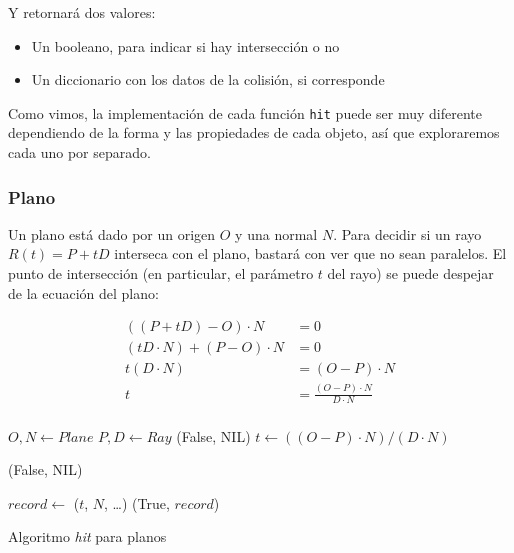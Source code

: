 Y retornará dos valores:

\begin{itemize}
    \item Un booleano, para indicar si hay intersección o no
    \item Un diccionario con los datos de la colisión, si corresponde
\end{itemize}

Como vimos, la implementación de cada función \texttt{hit} puede ser muy
diferente dependiendo de la forma y las propiedades de cada objeto, así que
exploraremos cada uno por separado.

\subsubsection{Plano}

Un plano está dado por un origen $O$ y una normal $N$. Para decidir si un rayo
$R(t) = P + tD$ interseca con el plano, bastará con ver que no sean paralelos.
El punto de intersección (en particular, el parámetro $t$ del rayo) se puede
despejar de la ecuación del plano:

\begin{align*}
    ((P + tD) - O) \cdot N &= 0 \\
    (tD \cdot N) + (P - O) \cdot N &= 0 \\
    t(D \cdot N) &= (O - P) \cdot N \\
    t &= \frac{(O - P) \cdot N}{D \cdot N} \\
\end{align*}

\begin{algorithm}[H]
\begin{algorithmic}[1]
    \State $O, N \gets Plane$ 
    \State $P, D \gets Ray$ 
     
        \State \Return (False, NIL)
    \EndIf
    \State $t \gets ((O - P) \cdot N)/(D \cdot N)$

     
        \State \Return (False, NIL)
    \EndIf

    \State $record \gets$ ($t$, $N$, \dots) 
    \State \Return (True, $record$)
\EndFunction
\end{algorithmic}
\caption{Algoritmo \textit{hit} para planos}
\label{alg:plane-hit}
\end{algorithm}

